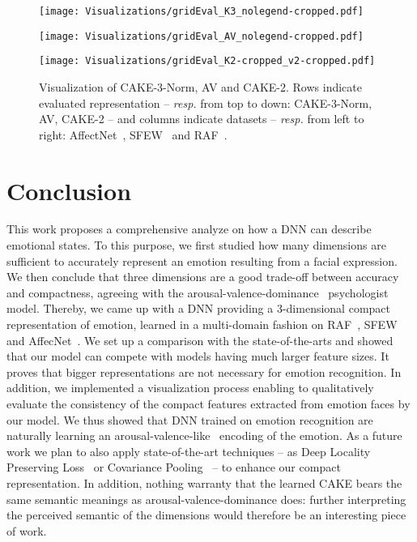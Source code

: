 \documentclass{bmvc2k}
\begin{document}
\begin{figure}[hb]
    \begin{minipage}{.86\linewidth}
    \texttt{[image: Visualizations/gridEval\_K3\_nolegend-cropped.pdf]}
    \end{minipage}
    \begin{minipage}{.86\linewidth}
    \texttt{[image: Visualizations/gridEval\_AV\_nolegend-cropped.pdf]}
    \end{minipage}
    \begin{minipage}{.86\linewidth}
    \texttt{[image: Visualizations/gridEval\_K2-cropped\_v2-cropped.pdf]}
    \end{minipage}
  \caption{Visualization of CAKE-3-Norm, AV and CAKE-2. Rows indicate evaluated representation -- \textit{resp.} from top to down: CAKE-3-Norm, AV, CAKE-2 -- and columns indicate datasets -- \textit{resp.} from left to right: AffectNet~\cite{mollahosseini_affectnet:_2017}, SFEW~\cite{dhall_static_2011} and RAF~\cite{li_reliable_2017}.}
  \label{fig:visu}
\end{figure} \section{Conclusion}
This work proposes a comprehensive analyze on how a DNN can describe emotional states. To this purpose, we first studied how many dimensions are sufficient to accurately represent an emotion resulting from a facial expression. We then conclude that three dimensions are a good trade-off between accuracy and compactness, agreeing with the arousal-valence-dominance~\cite{russell_circumplex_1980}\cite{mehrabian1996pleasure} psychologist model.
Thereby, we came up with a DNN providing a 3-dimensional compact representation of emotion, learned in a multi-domain fashion on RAF~\cite{li_reliable_2017}, SFEW~\cite{dhall_static_2011} and AffecNet~\cite{mollahosseini_affectnet:_2017}. We set up a comparison with the state-of-the-arts and showed that our model can compete with models having much larger feature sizes. It proves that bigger representations are not necessary for emotion recognition. In addition, we implemented a visualization process enabling to qualitatively evaluate the consistency of the compact features extracted from emotion faces by our model. We thus showed that DNN trained on emotion recognition are naturally learning an arousal-valence-like~\cite{russell_circumplex_1980} encoding of the emotion. As a future work we plan to also apply state-of-the-art techniques -- as Deep Locality Preserving Loss~\cite{li_reliable_2017} or Covariance Pooling~\cite{acharya_covariance_2018} -- to enhance our compact representation. In addition, nothing warranty that the learned CAKE bears the same semantic meanings as arousal-valence-dominance does: further interpreting the perceived semantic of the dimensions would therefore be an interesting piece of work.

%
 
\end{document}
